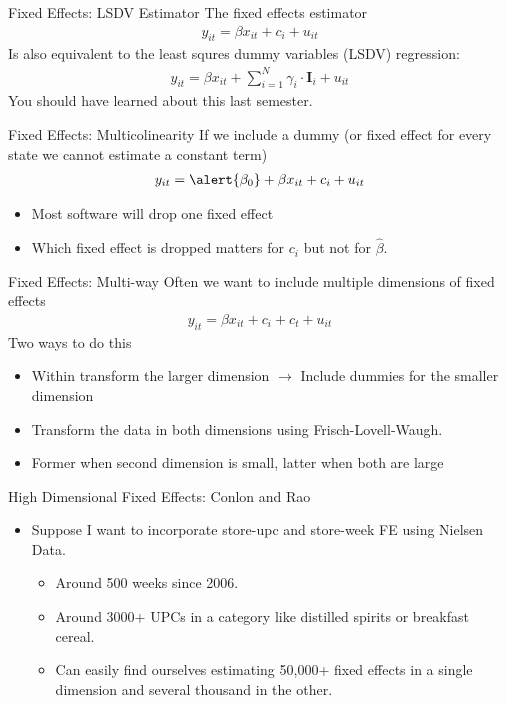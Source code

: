 \documentclass[aspectratio=169]{beamer}
\begin{document}
\begin{frame}{Fixed Effects: LSDV Estimator}
The fixed effects estimator
\begin{align*}
y_{it} = \beta x_{it} + c_i + u_{it}
\end{align*}
Is also equivalent to the least squres dummy variables (LSDV) regression:
\begin{align*}
y_{it} = \beta x_{it} + \sum_{i=1}^N \gamma_i \cdot \mathbf{I}_{i} + u_{it}
\end{align*}
You should have learned about this last semester.
\end{frame}


\begin{frame}{Fixed Effects: Multicolinearity}
If we include a dummy (or fixed effect for every state we cannot estimate a constant term)
\begin{align*}
y_{it} = \alert{\beta_0} + \beta x_{it} + c_i + u_{it}
\end{align*}
\begin{itemize}
\item Most software will drop one fixed effect
\item Which fixed effect is dropped matters for $c_i$ but not for $\widehat{\beta}$.    
\end{itemize}
\end{frame}

\begin{frame}{Fixed Effects: Multi-way}
Often we want to include multiple dimensions of fixed effects
\begin{align*}
y_{it} =\beta x_{it} + c_i + c_t + u_{it}
\end{align*}
Two ways to do this
\begin{itemize}
\item Within transform the larger dimension $\rightarrow$ Include dummies for the smaller dimension
\item Transform the data in both dimensions using \alert{Frisch-Lovell-Waugh}.
\item Former when second dimension is small, latter when both are large
\end{itemize}
\end{frame}


\begin{frame}{High Dimensional Fixed Effects: Conlon and Rao} 
\begin{itemize}
 \item Suppose I want to incorporate \alert{store-upc} and \alert{store-week} FE using Nielsen Data.
\begin{itemize}
\item Around 500 weeks since 2006.
\item Around 3000+ UPCs in a category like distilled spirits or breakfast cereal.
\item Can easily find ourselves estimating 50,000+ fixed effects in a single dimension and several thousand in the other.
\end{itemize}
  \end{itemize}
\end{frame}
\end{document}
